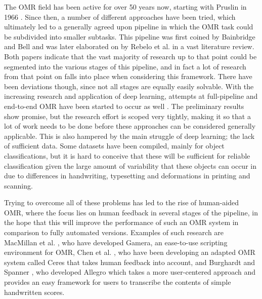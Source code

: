The OMR field has been active for over 50 years now, starting with Pruslin in 1966 \citep{Pruslin1992}. Since then, a number of different approaches have been tried, which ultimately led to a generally agreed upon pipeline in which the OMR task could be subdivided into smaller subtasks. This pipeline was first coined by Bainbridge and Bell \citep{Bainbridge2001} and was later elaborated on by Rebelo et al. \citep{Rebelo2012} in a vast literature review. Both papers indicate that the vast majority of research up to that point could be segmented into the various stages of this pipeline, and in fact a lot of research from that point on falls into place when considering this framework. There have been deviations though, since not all stages are equally easily solvable. With the increasing research and application of deep learning, attempts at full-pipeline and end-to-end OMR have been started to occur as well \citep{CalvoZaragoza2017, Pacha2019}. The preliminary results show promise, but the research effort is scoped very tightly, making it so that a lot of work needs to be done before these approaches can be considered generally applicable. This is also hampered by the main struggle of deep learning; the lack of sufficient data. Some datasets have been compiled, mainly for object classifications, but it is hard to conceive that these will be sufficient for reliable classification given the large amount of variability that these objects can occur in due to differences in handwriting, typesetting and deformations in printing and scanning.

Trying to overcome all of these problems has led to the rise of human-aided OMR, where the focus lies on human feedback in several stages of the pipeline, in the hope that this will improve the performance of such an OMR system in comparison to fully automated versions. Examples of such research are MacMillan et al. \citep{Macmillan2002}, who have developed Gamera, an ease-to-use scripting environment for OMR, Chen et al. \citep{Chen2016, Chen2016b}, who have been developing an adapted OMR system called Ceres that takes human feedback into account, and Burghardt and Spanner \citep{Burghardt2017}, who developed Allegro which takes a more user-centered approach and provides an easy framework for users to transcribe the contents of simple handwritten scores.

